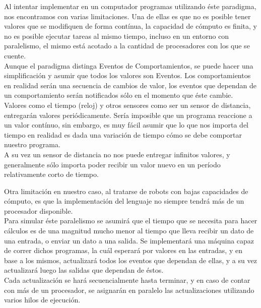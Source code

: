 
  Al intentar implementar en un computador programas utilizando éste paradigma, nos encontramos
con varias limitaciones.
  Una de ellas es que no es posible tener valores que se modifiquen de forma contínua, la capacidad
de cómputo es finita, y no es posible ejecutar tareas al mismo tiempo, incluso en un entorno con
paralelismo, el mismo está acotado a la cantidad de procesadores con los que se cuente.\\

  Aunque el paradigma distinga Eventos de Comportamientos, se puede hacer una simplificación y
asumir que todos los valores son Eventos. Los comportamientos en realidad serán una secuencia de
cambios de valor, los eventos que dependan de un comportamiento serán notificados sólo en el momento
que éste cambie.\\
  Valores como el tiempo (reloj) y otros sensores como ser un sensor de distancia, entregarán valores
periódicamente. Sería imposible que un programa reaccione a un valor contínuo, sin embargo, es muy fácil
asumir que lo que nos importa del tiempo en realidad es dada una variación de tiempo cómo se debe
comportar nuestro programa.\\
  A su vez un sensor de distancia no nos puede entregar infinitos valores, y generalmente sólo importa
poder recibir un valor nuevo en un período relativamente corto de tiempo.

  Otra limitación en nuestro caso, al tratarse de robots con bajas capacidades de cómputo, es que
la implementación del lenguaje no siempre tendrá más de un procesador disponible.\\
  Para simular éste paralelismo se asumirá que el tiempo que se necesita para hacer cálculos es de
una magnitud mucho menor al tiempo que lleva recibir un dato de una entrada, o enviar un dato a una salida.
  Se implementará una máquina capaz de correr dichos programas, la cuál esperará por valores en las entradas,
y en base a los mismos, actualizará todos los eventos que dependan de ellas, y a su vez actualizará luego
las salidas que dependan de éstos.\\
  Cada actualización se hará secuencialmente hasta terminar, y en caso de contar con más de un procesador, se
asignarán en paralelo las actualizaciones utilizando varios hilos de ejecución.\\


